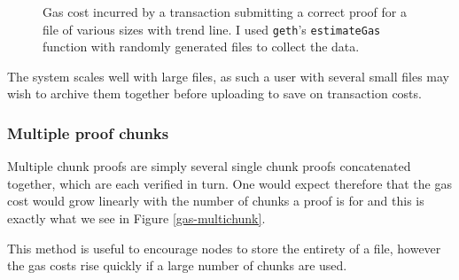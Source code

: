 \documentclass[12pt,a4paper,twoside,openright]{report}
\begin{document}
\begin{figure}[H]
\datatable
{}

\caption[Gas cost against file size]{Gas cost incurred by a transaction submitting a correct proof for a file of various sizes with trend line.
I used \texttt{geth}'s \texttt{estimateGas} function with randomly generated files to collect the data.}
\label{gas-filesize-base}
\end{figure}

The system scales well with large files, as such a user with several small files may wish to archive them together before uploading to save on transaction costs.

\subsubsection{Multiple proof chunks}


Multiple chunk proofs are simply several single chunk proofs concatenated together, which are each verified in turn.
One would expect therefore that the gas cost would grow linearly with the number of chunks a proof is for and this is exactly what we see in Figure \ref{gas-multichunk}.

This method is useful to encourage nodes to store the entirety of a file, however the gas costs rise quickly if a large number of
chunks are used.

\end{document}
